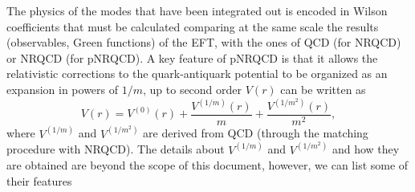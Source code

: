 \documentclass[10pt, a4paper, twocolumn]{article}
\begin{document}
The physics of the modes that have been integrated out is encoded in Wilson coefficients that must be calculated comparing at the same  scale the results (observables, Green functions) of the EFT, with the ones of QCD (for NRQCD) or NRQCD (for pNRQCD). A key feature of pNRQCD is that it allows the relativistic corrections to the quark-antiquark potential to be organized as an expansion in powers of $1/m$, up to second order $V(r)$ can be written as
\begin{equation}\label{pnrqcdpot}
    V(r)=V^{(0)}(r)+\frac{V^{(1/m)}(r)}{m}+\frac{V^{(1/m^2)}(r)}{m^2},
\end{equation} where $V^{(1/m)}$ and $V^{(1/m^2)}$ are derived from QCD (through the matching procedure with NRQCD). The details about $V^{(1/m)}$ and $V^{(1/m^2)}$  and how they are obtained are beyond the scope of this document, however, we can list some of their features
\end{document}
